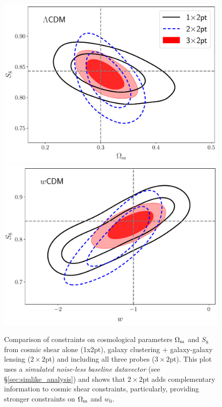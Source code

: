 \documentclass[fleqn,usenatbib]{mnras}
\begin{document}
\begin{figure}
\includegraphics[width=\columnwidth]{figs/simulated_lcdm_compare.pdf}
\includegraphics[width=\columnwidth]{figs/simulated_wcdm_compare.pdf}
\caption[]{Comparison of  constraints on cosmological parameters $\Omega_{\rm m}$ and $S_8$ from cosmic shear alone (1x2pt), galaxy clustering + galaxy-galaxy lensing ($2\times2$pt) and including all three probes ($3\times2$pt). This plot uses a \textit{simulated noise-less baseline datavector} (see \S\ref{sec:simlike_analysis}) and shows that $2\times2$pt adds complementary information to cosmic shear constraints, particularly, providing stronger constraints on $\Omega_{\rm m}$ and $w_0$.}
\label{fig:all2pt_comp}
\end{figure}
\end{document}
